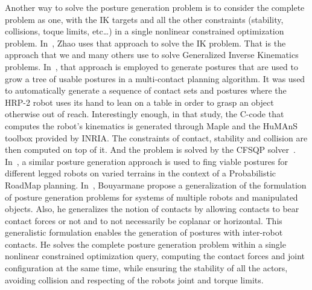 Another way to solve the posture generation problem is to consider the complete problem as one, with the IK targets and all the other constraints (stability, collisions, toque limits, etc\ldots) in a single nonlinear constrained optimization problem.
In~\cite{Zhao1994}, Zhao uses that approach to solve the IK problem.
That is the approach that we and many others use to solve Generalized Inverse Kinematics problems.
In~\cite{escande:iros:2006}, that approach is employed to generate postures that are used to grow a tree of usable postures in a multi-contact planning algorithm. It was used to automatically generate a sequence of contact sets and postures where the HRP-2 robot uses its hand to lean on a table in order to grasp an object otherwise out of reach.
Interestingly enough, in that study, the C-code that computes the robot's kinematics is generated through Maple and the HuMAnS toolbox provided by INRIA.
The constraints of contact, stability and collision are then computed on top of it.
And the problem is solved by the CFSQP solver~\cite{cfsqp:manual}.
In~\cite{hauser:ijrr:2008}, a similar posture generation approach is used to fing viable postures for different legged robots on varied terrains in the context of a Probabilistic RoadMap planning.
In~\cite{bouyarmane2010static}, Bouyarmane propose a generalization of the formulation of posture generation problems for systems of multiple robots and manipulated objects.
Also, he generalizes the notion of contacts by allowing contacts to bear contact forces or not and to not necessarily be coplanar or horizontal.
This generalistic formulation enables the generation of postures with inter-robot contacts.
He solves the complete posture generation problem within a single nonlinear constrained optimization query, computing the contact forces and joint configuration at the same time, while ensuring the stability of all the actors, avoiding collision and respecting of the robots joint and torque limits.

